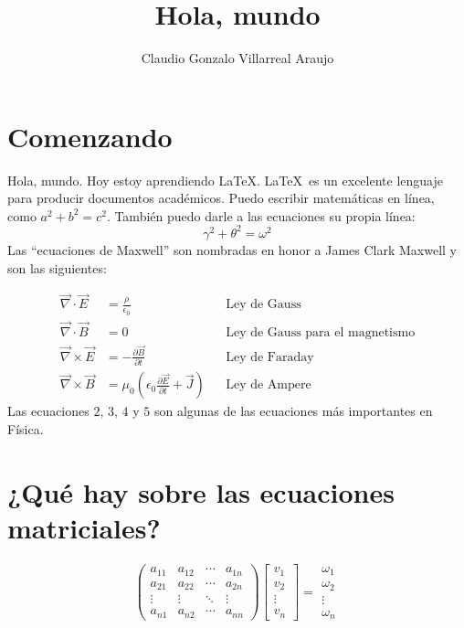 \documentclass{article}
\title{Hola, mundo}
\author{Claudio Gonzalo Villarreal Araujo}
\begin{document}
	
	\maketitle
	
	\section{Comenzando}
	Hola, mundo. Hoy estoy aprendiendo \LaTeX. \LaTeX\ es un excelente lenguaje para producir documentos académicos. Puedo escribir matemáticas en línea, como \( a^2 + b^2 = c^2 \). También puedo darle a las ecuaciones su propia línea:
	\begin{equation}
		\gamma^2 + \theta^2 = \omega^2
	\end{equation}
	Las “ecuaciones de Maxwell” son nombradas en honor a James Clark Maxwell y son las siguientes:
	
	\begin{align}
		\vec{\nabla} \cdot \vec{E} &= \frac{\rho}{\epsilon_0} && \text{Ley de Gauss} \\
		\vec{\nabla} \cdot \vec{B} &= 0 && \text{Ley de Gauss para el magnetismo} \\
		\vec{\nabla} \times \vec{E} &= - \frac{\partial \vec{B}}{\partial t} && \text{Ley de Faraday} \\
		\vec{\nabla} \times \vec{B} &= \mu_0 \left( \epsilon_0 \frac{\partial \vec{E}}{\partial t} + \vec{J} \right) && \text{Ley de Ampere}
	\end{align}
	Las ecuaciones \(2\), \(3\), \(4\) y \(5\) son algunas de las ecuaciones más importantes en Física.
	
	\section{¿Qué hay sobre las ecuaciones matriciales?}
	
\[
\begin{pmatrix}
	a_{11} & a_{12} & \cdots & a_{1n} \\
	a_{21} & a_{22} & \cdots & a_{2n} \\
	\vdots & \vdots & \ddots & \vdots \\
	a_{n1} & a_{n2} & \cdots & a_{nn}
\end{pmatrix}
\begin{bmatrix}
	v_1 \\
	v_2 \\
	\vdots \\
	v_n
\end{bmatrix}
=
\begin{array}{cc}
	\omega_1 \\
	\omega_2 \\
	\vdots \\
	\omega_n
\end{array}
\]
\end{document}
